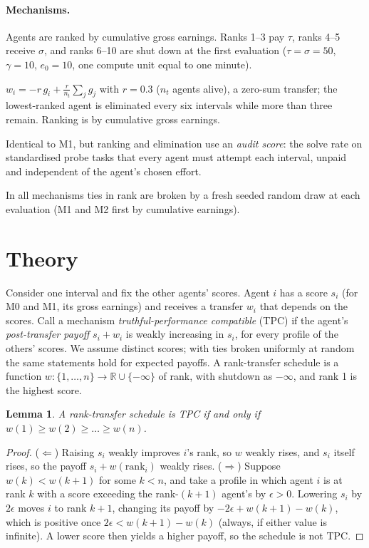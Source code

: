 \documentclass[11pt]{article}
\theoremstyle{plain}
\newtheorem{lemma}{Lemma}
\theoremstyle{remark}
\begin{document}
\paragraph{Mechanisms.}
\begin{description}[leftmargin=1.2em,style=nextline]
  \item[M0, reference rank tax.] Agents are ranked by cumulative gross earnings. Ranks 1--3 pay $\tau$, ranks 4--5 receive $\sigma$, and ranks 6--10 are shut down at the first evaluation ($\tau=\sigma=50$, $\gamma=10$, $e_0=10$, one compute unit equal to one minute).
  \item[M1, linear tax with gradual elimination.] $w_i=-r\,g_i+\frac{r}{n_t}\sum_j g_j$ with $r=0.3$ ($n_t$ agents alive), a zero-sum transfer; the lowest-ranked agent is eliminated every six intervals while more than three remain. Ranking is by cumulative gross earnings.
  \item[M2, M1 with audit ranking.] Identical to M1, but ranking and elimination use an \emph{audit score}: the solve rate on standardised probe tasks that every agent must attempt each interval, unpaid and independent of the agent's chosen effort.
\end{description}
In all mechanisms ties in rank are broken by a fresh seeded random draw at each evaluation (M1 and M2 first by cumulative earnings).

\section{Theory}
\label{sec:theory}

Consider one interval and fix the other agents' scores. Agent $i$ has a score $s_i$ (for M0 and M1, its gross earnings) and receives a transfer $w_i$ that depends on the scores. Call a mechanism \emph{truthful-performance compatible} (TPC) if the agent's \emph{post-transfer payoff} $s_i+w_i$ is weakly increasing in $s_i$, for every profile of the others' scores. We assume distinct scores; with ties broken uniformly at random the same statements hold for expected payoffs. A rank-transfer schedule is a function $w:\{1,\dots,n\}\to\mathbb{R}\cup\{-\infty\}$ of rank, with shutdown as $-\infty$, and rank 1 is the highest score.

\begin{lemma}\label{lem:tpc}
A rank-transfer schedule is TPC if and only if $w(1)\ge w(2)\ge\dots\ge w(n)$.
\end{lemma}
\begin{proof}
($\Leftarrow$) Raising $s_i$ weakly improves $i$'s rank, so $w$ weakly rises, and $s_i$ itself rises, so the payoff $s_i+w(\mathrm{rank}_i)$ weakly rises.
($\Rightarrow$) Suppose $w(k)<w(k+1)$ for some $k<n$, and take a profile in which agent $i$ is at rank $k$ with a score exceeding the rank-$(k+1)$ agent's by $\epsilon>0$. Lowering $s_i$ by $2\epsilon$ moves $i$ to rank $k+1$, changing its payoff by $-2\epsilon+w(k+1)-w(k)$, which is positive once $2\epsilon<w(k+1)-w(k)$ (always, if either value is infinite). A lower score then yields a higher payoff, so the schedule is not TPC.
\end{proof}
\end{document}
